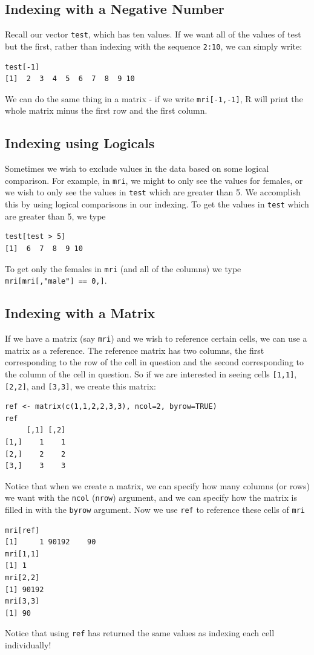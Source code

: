 \documentclass[11pt,letterpaper,fleqn]{report}
\begin{document}
\subsection{Indexing with a Negative Number}
Recall our vector \texttt{test}, which has ten values. If we want all of the values of test but the first, rather than indexing with the sequence \texttt{2:10}, we can simply write:
\begin{verbatim}
test[-1]
[1]  2  3  4  5  6  7  8  9 10
\end{verbatim}
We can do the same thing in a matrix - if we write \texttt{mri[-1,-1]}, R will print the whole matrix minus the first row and the first column.
\subsection{Indexing using Logicals}
Sometimes we wish to exclude values in the data based on some logical comparison. For example, in \texttt{mri}, we might to only see the values for females, or we wish to only see the values in \texttt{test} which are greater than 5. We accomplish this by using logical comparisons in our indexing. To get the values in \texttt{test} which are greater than 5, we type
\begin{verbatim}
test[test > 5]
[1]  6  7  8  9 10
\end{verbatim}
To get only the females in \texttt{mri} (and all of the columns) we type \texttt{mri[mri[,"male"] == 0,]}.
\subsection{Indexing with a Matrix}
If we have a matrix (say \texttt{mri}) and we wish to reference certain cells, we can use a matrix as a reference. The reference matrix has two columns, the first corresponding to the row of the cell in question and the second corresponding to the column of the cell in question. So if we are interested in seeing cells \texttt{[1,1]}, \texttt{[2,2]}, and \texttt{[3,3]}, we create this matrix:
\begin{verbatim}
ref <- matrix(c(1,1,2,2,3,3), ncol=2, byrow=TRUE)
ref
     [,1] [,2]
[1,]    1    1
[2,]    2    2
[3,]    3    3
\end{verbatim}
Notice that when we create a matrix, we can specify how many columns (or rows) we want with the \texttt{ncol} (\texttt{nrow}) argument, and we can specify how the matrix is filled in with the \texttt{byrow} argument. Now we use \texttt{ref} to reference these cells of \texttt{mri}
\begin{verbatim}
mri[ref]
[1]     1 90192    90
mri[1,1]
[1] 1
mri[2,2]
[1] 90192
mri[3,3]
[1] 90
\end{verbatim} 
Notice that using \texttt{ref} has returned the same values as indexing each cell individually!
\end{document}
